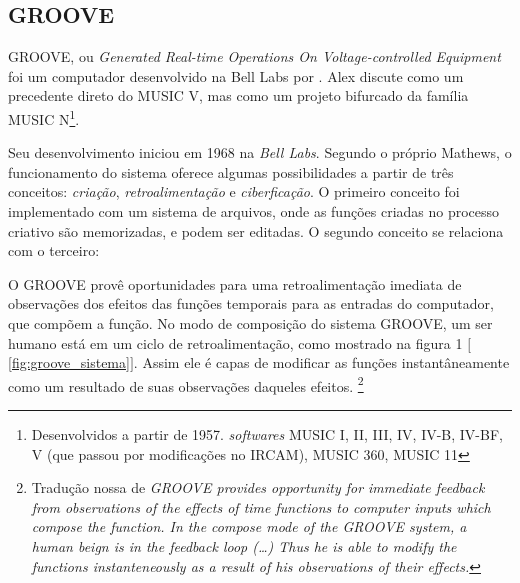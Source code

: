 \subsection{GROOVE}\label{sec:groove}

GROOVE, ou \emph{Generated Real-time Operations On Voltage-controlled Equipment} foi um computador desenvolvido na Bell Labs por \cite{mathews_groove_1970}. Alex  discute como um precedente direto do MUSIC V, mas como um projeto bifurcado da família MUSIC N\footnote{Desenvolvidos a partir de 1957. \emph{softwares} MUSIC I, II, III, IV, IV-B, IV-BF, V (que passou por modificações no IRCAM), MUSIC 360, MUSIC 11}.

Seu desenvolvimento iniciou em 1968 na \emph{Bell Labs}. Segundo o próprio Mathews, o funcionamento do sistema oferece algumas possibilidades a partir de três conceitos: \emph{criação}, \emph{retroalimentação} e \emph{ciberficação}. O primeiro conceito foi implementado com um sistema de arquivos, onde as funções criadas no processo criativo são memorizadas, e podem ser editadas. O segundo conceito se relaciona com o terceiro:

\begin{citacao}
O GROOVE provê oportunidades para uma retroalimentação imediata de observações dos efeitos das funções temporais para as entradas do computador, que compõem a função. No modo de composição do sistema GROOVE, um ser humano está em um ciclo de retroalimentação, como mostrado na figura 1 $[$\autoref{fig:groove_sistema}$]$. Assim ele é capas de modificar as funções instantâneamente como um resultado de suas observações daqueles efeitos.\cite[p.~715]{mathews_groove_1970}
\footnote{Tradução nossa de \emph{GROOVE provides opportunity for immediate feedback from observations of the effects of time functions to computer inputs which compose the function. In the compose mode of the GROOVE system, a human beign is in the feedback loop (\ldots) Thus he is able to modify the functions instanteneously as a result of his observations of their effects.}}
\end{citacao}

